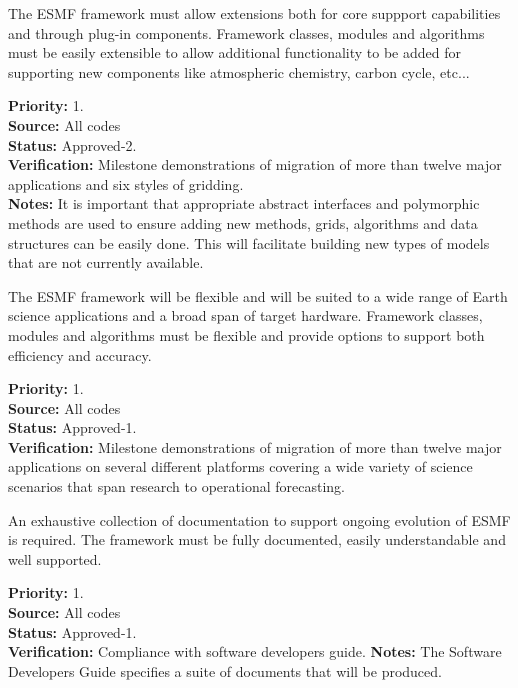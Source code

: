  The ESMF framework must allow extensions both
for core suppport capabilities and through plug-in components.
Framework classes, modules and algorithms must be easily extensible
to allow additional functionality to be added for supporting new components
like atmospheric chemistry, carbon cycle, etc...
\begin{reqlist}
{\bf Priority:} 1. \\
{\bf Source:} All codes\\
{\bf Status:} Approved-2. \\
{\bf Verification:} Milestone demonstrations of migration
of more than twelve major applications and six styles of gridding.\\
{\bf Notes:} It is important that appropriate abstract interfaces and polymorphic 
methods are used to ensure adding new methods, grids, algorithms and data structures
can be easily done. This will facilitate building new types of models that are not
currently available.
\end{reqlist}

 The ESMF framework will be flexible and will
be suited to a wide range of Earth science applications and a broad span
of target hardware. Framework classes, modules and algorithms must be flexible and
provide options to support both efficiency and accuracy.
\begin{reqlist}
{\bf Priority:} 1. \\
{\bf Source:} All codes\\
{\bf Status:} Approved-1. \\
{\bf Verification:} Milestone demonstrations of migration
of more than twelve major applications on several different
platforms covering a wide variety of science scenarios
that span research to operational forecasting.
\end{reqlist}

 An exhaustive collection of documentation
to support ongoing evolution of ESMF is required. The framework must be 
fully documented, easily understandable and well supported.
\begin{reqlist}
{\bf Priority:} 1. \\
{\bf Source:} All codes\\
{\bf Status:} Approved-1. \\
{\bf Verification:} Compliance with software developers guide.
{\bf Notes:} The Software Developers Guide specifies a suite of documents 
that will be produced.
\end{reqlist}

